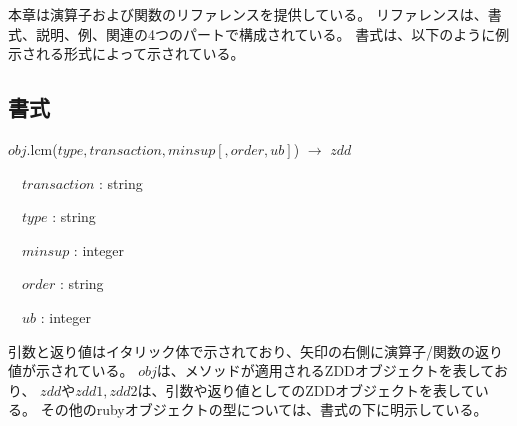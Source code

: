 
本章は演算子および関数のリファレンスを提供している。
リファレンスは、書式、説明、例、関連の4つのパートで構成されている。
書式は、以下のように例示される形式によって示されている。
\begin{center}
\begin{minipage}{0.8\hsize}
\subsection*{書式}
$obj$.lcm($type,transaction,minsup[,order,ub]$) $\rightarrow$ $zdd$

~~$transaction$ : string

~~$type$ : string

~~$minsup$ : integer

~~$order$ : string

~~$ub$ : integer
\end{minipage}
\end{center}



引数と返り値はイタリック体で示されており、矢印の右側に演算子/関数の返り値が示されている。
$obj$は、メソッドが適用されるZDDオブジェクトを表しており、
$zdd$や$zdd1,zdd2$は、引数や返り値としてのZDDオブジェクトを表している。
その他のrubyオブジェクトの型については、書式の下に明示している。

